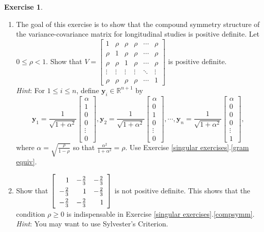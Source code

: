 \documentclass[12pt,letterpaper]{book}
\numberwithin{equation}{section}
\theoremstyle{definition}
\newtheorem{exercise}{\textbf{Exercise}}[chapter]
\newcommand{\vy}{\bm{y}}
\begin{document}
\begin{exercise}
\begin{enumerate}[\bfseries 1.]
\item\label{compsymm} The goal of this exercise is to show that the compound symmetry structure of the variance-covariance matrix for longitudinal studies is positive definite. Let $0\leq \rho<1$. Show that $V=\left[\begin{array}{cccccc}1 & \rho & \rho & \rho & \cdots & \rho \\ \rho & 1 & \rho & \rho & \cdots & \rho  \\ \rho & \rho & 1 & \rho & \cdots & \rho \\ \vdots & \vdots & \vdots & \vdots & \ddots & \vdots \\ \rho & \rho & \rho & \rho & \cdots & 1 \end{array}\right]$ is positive definite. 
\\\textit{Hint}: For $1\leq i \leq n$, define $\vy_i \in \mathbb{R}^{n+1}$ by
$$\vy_1=\frac{1}{\sqrt{1+\alpha^2}}\left[\begin{array}{c} \alpha \\ 1 \\ 0 \\0 \\ \vdots \\ 0  \end{array}\right], \vy_2=\frac{1}{\sqrt{1+\alpha^2}}\left[\begin{array}{c} \alpha \\ 0 \\ 1 \\0 \\ \vdots \\ 0  \end{array}\right],\cdots,\vy_n=\frac{1}{\sqrt{1+\alpha^2}}\left[\begin{array}{c} \alpha \\ 0 \\ 0 \\0 \\ \vdots \\ 1  \end{array}\right],$$
where $\alpha=\sqrt{\frac{\rho}{1-\rho}}$ so that $\frac{\alpha^2}{1+\alpha^2}=\rho$. Use Exercise \ref{singular exercises}.\ref{gram equiv}.

\item Show that $\begingroup\renewcommand*{\arraystretch}{1.3}\left[\begin{array}{rrr}1 & -\frac{2}{3} & -\frac{2}{3} \\ -\frac{2}{3} & 1 &  -\frac{2}{3} \\ -\frac{2}{3} & -\frac{2}{3} & 1  \end{array}\right]\endgroup$ is not positive definite. This shows that the condition $\rho\geq 0$ is indispensable in Exercise \ref{singular exercises}.\ref{compsymm}. \\\textit{Hint}: You may want to use Sylvester's Criterion.


\end{enumerate}
\end{exercise}
\end{document}
